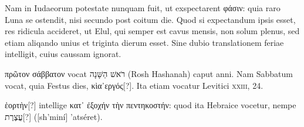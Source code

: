\begin{parnumbers}
Nam in Iudaeorum potestate
nunquam fuit, ut exspectarent \textgreek{φάσιν}:
 quia raro Luna se ostendit,
nisi secundo post coitum die.
\lnr{}Quod si expectandum ipsis esset,
res ridicula accideret, ut Elul, qui semper est cavus mensis, non solum
plenus, sed etiam aliqando unius et triginta dierum esset.
\lnr{}Sine dubio translationem feriae intelligit, cuius caussam ignorat.

\textgreek{πρῶτον σάββατον} vocat
 \texthebrew{רֹאשׁ הַשָּׁנָה‎} (Rosh Hashanah) caput anni.
\lnr{}Nam Sabbatum vocat, quia Festus
dies, \textgreek{κὶα᾽εργός}[?].
\lnr{}Ita etiam vocatur Levitici \textsc{xxiii}, 24.

\textgreek{ἑορτὴν}[?]
 intellige
\textgreek{κατ᾽ ἐξοχήν τὴν πεντηκοστήν}:
 quod ita Hebraice vocetur, nempe \texthebrew{עֲצֶרֶת}[?] ([sh'miní] 'atséret).
 

\end{parnumbers}
